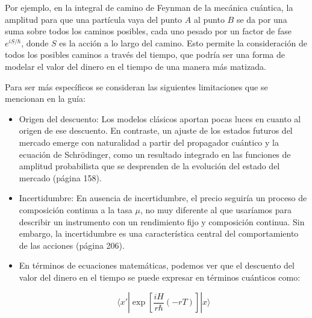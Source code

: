 \begin{problema}
\begin{sol}
\begin{enumerate}
    Por ejemplo, en la integral de camino de Feynman de la mecánica cuántica, la amplitud para que una partícula vaya del punto $A$ al punto $B$ se da por una suma sobre todos los caminos posibles, cada uno pesado por un factor de fase $e^{iS/\hbar}$, donde $S$ es la acción a lo largo del camino. Esto permite la consideración de todos los posibles caminos a través del tiempo, que podría ser una forma de modelar el valor del dinero en el tiempo de una manera más matizada.

    Para ser más específicos se consideran las siguientes limitaciones que se mencionan en la guía: 

    \begin{itemize}
        \item Origen del descuento: Los modelos clásicos aportan pocas luces en cuanto al origen de ese descuento. En contraste, un ajuste de los estados futuros del mercado emerge con naturalidad a partir del propagador cuántico y la ecuación de Schrödinger, como un resultado integrado en las funciones de amplitud probabilista que se desprenden de la evolución del estado del mercado (página 158).
        \item Incertidumbre: En ausencia de incertidumbre, el precio seguiría un proceso de composición continua a la tasa $\mu$, no muy diferente al que usaríamos para describir un instrumento con un rendimiento fijo y composición continua. Sin embargo, la incertidumbre es una característica central del comportamiento de las acciones (página 206).
        \item En términos de ecuaciones matemáticas, podemos ver que el descuento del valor del dinero en el tiempo se puede expresar en términos cuánticos como:
        
        $$\langle x'|\exp\left[\frac{iH}{r\hbar} (-rT)\right] |x \rangle$$
        

\end{itemize}
\end{enumerate}
\end{sol}
\end{problema}

